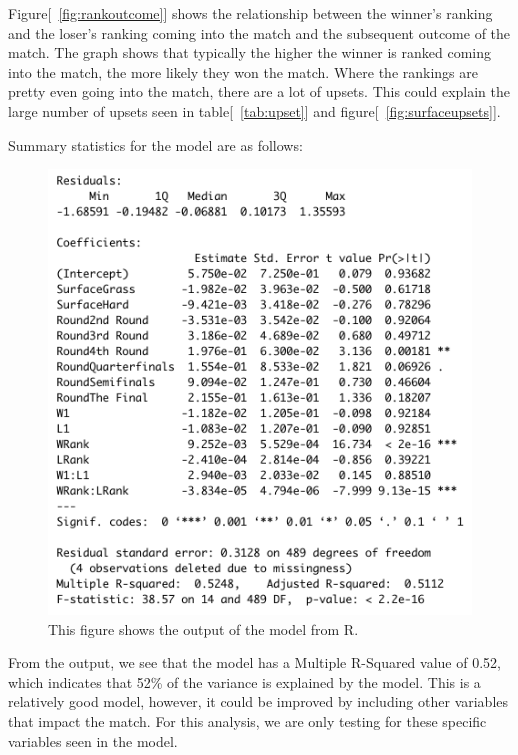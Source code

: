\documentclass[12pt]{article}
\begin{document}
Figure[~\ref{fig:rankoutcome}] shows the relationship between the winner's ranking and the loser's 
ranking coming into the match and the subsequent outcome of the match. The graph shows that 
typically the higher the winner is ranked coming into the match, the more likely they won 
the match. Where the rankings are pretty even going into the match, there are a lot of upsets. 
This could explain the large number of upsets seen in table[~\ref{tab:upset}] and figure[~\ref{fig:surfaceupsets}].


Summary statistics for the model are as follows:

\begin{figure} [! h]
  \centering
  \includegraphics[width=\textwidth, scale=0.25]{logreg.pdf}
  \caption{This figure shows the output of the model from R.}
 \label{fig:logreg}
\end{figure}

From the output, we see that the model has a Multiple R-Squared value of 0.52, which indicates 
that 52\% of the variance is explained by the model. This is a relatively good model, however, 
it could be improved by including other variables that impact the match. For this analysis, we 
are only testing for these specific variables seen in the model.
\end{document}
